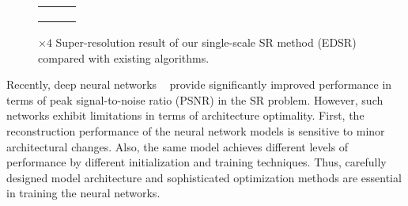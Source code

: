 \documentclass[10pt,twocolumn,letterpaper]{article}
\begin{document}
	\begin{figure}[t]
		\captionsetup[subfloat]{labelformat=empty}
		\begin{center}
			\newcommand{\rowArg}{2.65cm}
			\newcommand{\fullSize}{6.05cm}
			\newcommand{\patchSize}{2.6cm}
\setlength\tabcolsep{0.05cm}
			\begin{tabular}[b]{c c c}
				\multicolumn{2}{c}{\multirow{2}{*}[\rowArg]{
						\subfloat[0853 from DIV2K~\cite{Timofte_2017_CVPR_Workshops}]
{\includegraphics[height=\fullSize, trim={0.7cm 0 0.7cm 0}, clip]
							{figs/val_0853_Full_cut.png}}}} &
				\subfloat[HR  \protect\linebreak(PSNR / SSIM)]{
					\includegraphics[width = \patchSize, height = \patchSize]
					{figs/val_0853_GT.png}} \\ [-0.3cm]& &
				\subfloat[Bicubic  \protect\linebreak(30.80 dB / 0.9537)]{
					\includegraphics[width = \patchSize, height = \patchSize]
					{figs/val_0853_Bicubic.png}} \\ [-0.3cm]
				
				\subfloat[VDSR \cite{kim2016accurate}  \protect\linebreak(32.82 dB / 0.9623)]{
					\includegraphics[width = \patchSize, height = \patchSize]
					{figs/val_0853_VDSR.png}} &
				\subfloat[SRResNet \cite{ledig2016photo}  \protect\linebreak(34.00 dB / 0.9679)]{
					\includegraphics[width = \patchSize, height = \patchSize]
					{figs/val_0853_SRResNet_reproduce.png}}	&
				\subfloat[\textbf{EDSR+} (Ours)  \protect\linebreak(\textcolor{red}{34.78 dB} / \textcolor{red}{0.9708})]{
					\includegraphics[width = \patchSize, height = \patchSize]
					{figs/val_0853_Ours_Single.png}}		
			\end{tabular}		
\end{center}
		\setlength{\abovecaptionskip}{0cm}
		\captionsetup{justification=raggedright,singlelinecheck=false}
		\caption{$\times 4$ Super-resolution result of our single-scale SR method (EDSR) compared with existing algorithms.}
		
	\end{figure}
	
	Recently, deep neural networks ~\cite{kim2016accurate,kim2016deeply, ledig2016photo} provide significantly improved performance in terms of peak signal-to-noise ratio (PSNR) in the SR problem. 
	However, such networks exhibit limitations in terms of architecture optimality. 
	First, the reconstruction performance of the neural network models is sensitive to minor architectural changes. 
	Also, the same model achieves different levels of performance by different initialization and training techniques. 
	Thus, carefully designed model architecture and sophisticated optimization methods are essential in training the neural networks.
	
\end{document}
